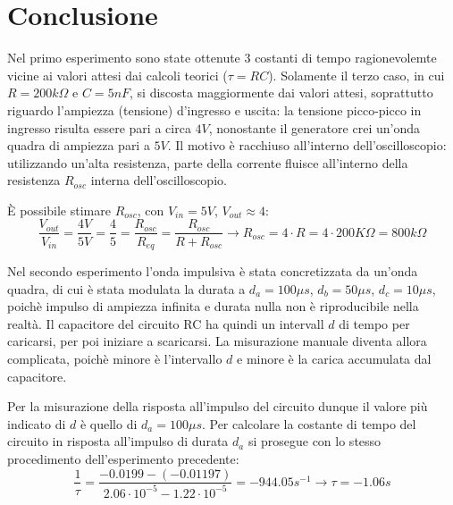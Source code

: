     \newpage
    \section{Conclusione}
    Nel primo esperimento sono state ottenute 3 costanti di tempo ragionevolemte vicine ai valori
    attesi dai calcoli teorici ($\tau = RC$). Solamente il terzo caso, in cui $R = 200k\Omega$ e $C = 5nF$, si discosta maggiormente
    dai valori attesi, soprattutto riguardo l'ampiezza (tensione) d'ingresso e uscita: la tensione picco-picco
    in ingresso risulta essere pari a circa $4 V$, nonostante il generatore crei un'onda quadra di ampiezza
    pari a $5V$. Il motivo è racchiuso all'interno dell'oscilloscopio: utilizzando un'alta resistenza,
    parte della corrente fluisce all'interno della resistenza $R_{osc}$ interna dell'oscilloscopio.\par
    È possibile stimare $R_{osc}$, con $V_{in} = 5V$, $V_{out} \approx 4$: 
    \begin{equation}
        \frac{V_{out}}{V_{in}} = \frac{4V}{5V} = \frac{4}{5} = \frac{R_{osc}}{R_{eq}} = \frac{R_{osc}}{R + R_{osc}} \longrightarrow
        R_{osc} = 4 \cdot R = 4 \cdot 200K\Omega = 800 k\Omega
    \end{equation}
    \par
    Nel secondo esperimento l'onda impulsiva è stata concretizzata da un'onda quadra, di cui è stata modulata la durata a $d_a = 100\mu s$, $d_b = 50 \mu s$, $d_c = 10 \mu s$,
    poichè impulso di ampiezza infinita e durata nulla non è riproducibile nella realtà.
    Il capacitore del circuito RC ha quindi un intervall $d$ di tempo per caricarsi, per poi iniziare a scaricarsi.
    La misurazione manuale diventa allora complicata, poichè minore è l'intervallo $d$ e minore è la carica accumulata dal capacitore.\par
    Per la misurazione della risposta all'impulso del circuito dunque il valore più indicato di $d$ è quello di $d_a = 100 \mu s$.
    Per calcolare la costante di tempo del circuito in risposta all'impulso di durata $d_a$ si prosegue con lo stesso
    procedimento dell'esperimento precedente:
    \begin{equation}
        \frac{1}{\tau} = \frac{-0.0199 - (-0.01197)}{2.06\cdot10^{-5} - 1.22\cdot10^{-5}} = -944.05s^{-1} \longrightarrow \tau = -1.06s
    \end{equation}

    
